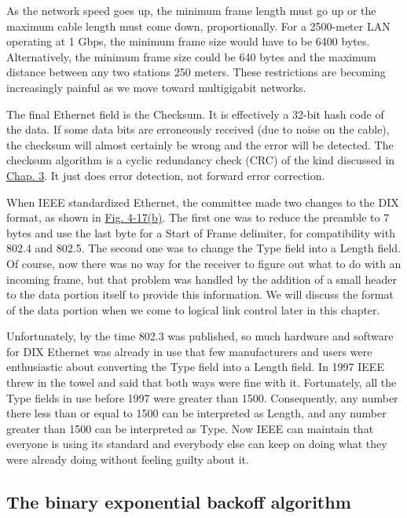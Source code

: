 \documentclass[b5paper,11pt]{memoir}
\begin{document}
As the network speed goes up, the minimum frame length must go up or the
maximum cable length must come down, proportionally. For a 2500-meter
LAN operating at 1 Gbps, the minimum frame size would have to be 6400
bytes. Alternatively, the minimum frame size could be 640 bytes and the
maximum distance between any two stations 250 meters. These restrictions
are becoming increasingly painful as we move toward multigigabit
networks.

The final Ethernet field is the {Checksum}. It is effectively a 32-bit
hash code of the data. If some data bits are erroneously received (due
to noise on the cable), the checksum will almost certainly be wrong and
the error will be detected. The checksum algorithm is a cyclic
redundancy check (CRC) of the kind discussed in
\protect\hyperlink{0130661023_ch03.htmlux5cux23ch03}{Chap. 3}. It just
does error detection, not forward error correction.

When IEEE standardized Ethernet, the committee made two changes to the
DIX format, as shown in
\protect\hyperlink{0130661023_ch04lev1sec3.htmlux5cux23ch04fig17}{Fig.
4-17(b)}. The first one was to reduce the preamble to 7 bytes and use
the last byte for a {Start of Frame} delimiter, for compatibility with
802.4 and 802.5. The second one was to change the {Type} field into a
{Length} field. Of course, now there was no way for the receiver to
figure out what to do with an incoming frame, but that problem was
handled by the addition of a small header to the data portion itself to
provide this information. We will discuss the format of the data portion
when we come to logical link control later in this chapter.

Unfortunately, by the time 802.3 was published, so much hardware and
software for DIX Ethernet was already in use that few manufacturers and
users were enthusiastic about converting the {Type} field into a
{Length} field. In 1997 IEEE threw in the towel and said that both ways
were fine with it. Fortunately, all the {Type} fields in use before 1997
were greater than 1500. Consequently, any number there less than or
equal to 1500 can be interpreted as {Length}, and any number greater
than 1500 can be interpreted as {Type}. Now IEEE can maintain that
everyone is using its standard and everybody else can keep on doing what
they were already doing without feeling guilty about it.

\protect\hypertarget{0130661023_ch04lev1sec3.htmlux5cux23ch04lev2sec12}{}{}

\subsection{The binary exponential backoff algorithm}
\end{document}
